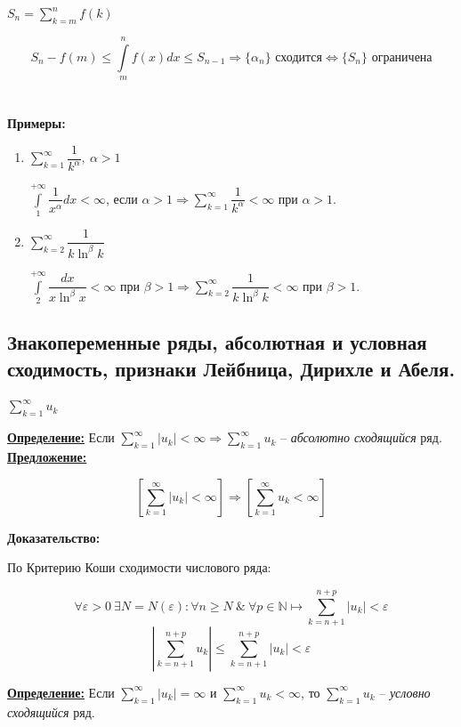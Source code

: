 \documentclass[a4paper,12pt]{article} %
\newcommand{\N}{\mathbb{N}}
\newcommand{\series}{\sum\limits_{k=1}^{\infty}}
\newcommand{\useries}{\sum\limits_{k=1}^{\infty} u_k}
\newcommand{\useriesl}{\sum\limits_{k=1}^{\infty} u_k < \infty}
\newcommand{\auseriesl}{\sum\limits_{k=1}^{\infty} |u_k| < \infty}
\newcommand{\auseriese}{\sum\limits_{k=1}^{\infty} |u_k| = \infty}
\begin{document}
$S_n = \sum\limits_{k=m}^{n} f(k)$

\[S_n - f(m) \leqslant \int\limits_{m}^{n} f(x)dx \leqslant S_{n-1} \Rightarrow \{ \alpha_n \} \text{ сходится} \Leftrightarrow \{ S_n \} \text{ ограничена} \]\\\\

\textbf{Примеры:}

\begin{enumerate}
	\item $\series \dfrac{1}{k^{\alpha}}, \ \alpha > 1$
	
	$\int\limits_{1}^{+\infty} \dfrac{1}{x^{\alpha}}dx < \infty$, если $\alpha > 1 \Rightarrow \series \dfrac{1}{k^{\alpha}} < \infty$ при $\alpha > 1$. 
	\item $\sum\limits_{k=2}^{\infty} \dfrac{1}{k \ln^{\beta}k}$
	
	$\int\limits_{2}^{+\infty} \dfrac{dx}{x \ln^{\beta}x} < \infty \text{ при } \beta > 1 \Rightarrow \sum\limits_{k=2}^{\infty}\dfrac{1}{k \ln^{\beta}k} < \infty \text{ при } \beta > 1$. \\
\end{enumerate}

\subsection{Знакопеременные ряды, абсолютная и условная сходимость, признаки Лейбница, Дирихле и Абеля.}

$\useries$

\underline{\textbf{Определение:}}
Если $\auseriesl \Rightarrow \useries$ -- \textit{абсолютно сходящийся} ряд.\\

\underline{\textbf{Предложение:}}

\[ \left[ \auseriesl \right] \Rightarrow \left[ \useriesl \right] \]

\textbf{Доказательство:}

По Критерию Коши сходимости числового ряда:

\[\forall \varepsilon > 0 \ \exists N = N(\varepsilon): \forall n \geqslant N \ \& \ \forall p \in \N \mapsto \sum\limits_{k=n+1}^{n+p} |u_k| < \varepsilon \]
\[\left| \sum\limits_{k=n+1}^{n+p} u_k \right| \leqslant \sum\limits_{k=n+1}^{n+p} |u_k| < \varepsilon\]

\underline{\textbf{Определение:}}
Если $\auseriese$ и $\useriesl$, то $\useries$ -- \textit{условно сходящийся} ряд.\\
\end{document}
